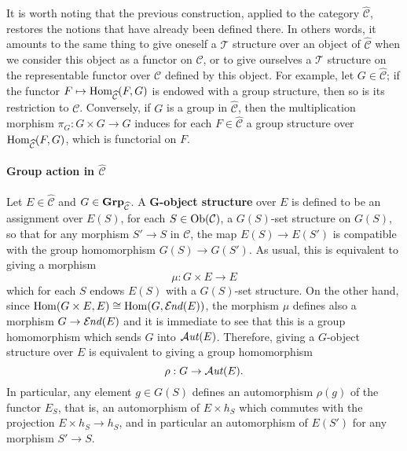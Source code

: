 \begin{remark}
It is worth noting that the previous construction, applied to the category $\widehat{\mathcal{C}}$, restores the notions that have already been defined there. In others words, it amounts to the same thing to give oneself a $\mathcal{T}$ structure over an object of $\widehat{\mathcal{C}}$ when we consider this object as a functor on $\mathcal{C}$, or to give ourselves a $\mathcal{T}$ structure on the representable functor over $\mathcal{C}$ defined by this object. For example, let $G\in\widehat{\mathcal{C}}$; if the functor $F\mapsto\mathrm{Hom}_{\widehat{\mathcal{C}}}(F,G)$ is endowed with a group structure, then so is its restriction to $\mathcal{C}$. Conversely, if $G$ is a group in $\widehat{\mathcal{C}}$, then the multiplication morphism $\pi_G:G\times G\to G$ induces for each $F\in\widehat{\mathcal{C}}$ a group structure over $\mathrm{Hom}_{\widehat{\mathcal{C}}}(F,G)$, which is functorial on $F$.
\end{remark}

\paragraph{Group action in \texorpdfstring{$\widehat{\mathcal{C}}$}{PSh}}
Let $E\in\widehat{\mathcal{C}}$ and $G\in\mathbf{Grp}_{\widehat{\mathcal{C}}}$. A \textbf{$\bm{G}$-object structure} over $E$ is defined to be an assignment over $E(S)$, for each $S\in\mathrm{Ob}(\mathcal{C})$, a $G(S)$-set structure on $G(S)$, so that for any morphism $S'\to S$ in $\mathcal{C}$, the map $E(S)\to E(S')$ is compatible with the group homomorphism $G(S)\to G(S')$. As usual, this is equivalent to giving a morphism
\[\mu:G\times E\to E\]
which for each $S$ endows $E(S)$ with a $G(S)$-set structure. On the other hand, since $\mathrm{Hom}(G\times E,E)\cong\mathrm{Hom}(G,\operatorname{\mathcal{E}\hspace*{-1pt}\textit{nd}\hspace{0.5pt}}(E))$, the morphism $\mu$ defines also a morphism $G\to\operatorname{\mathcal{E}\hspace*{-1pt}\textit{nd}\hspace{0.5pt}}(E)$ and it is immediate to see that this is a group homomorphism which sends $G$ into $\operatorname{\mathcal{A}\hspace*{-0.2pt}\textit{ut}\hspace{0.5pt}}(E)$. Therefore, giving a $G$-object structure over $E$ is equivalent to giving a group homomorphism
\[\rho:G\to\operatorname{\mathcal{A}\hspace*{-0.2pt}\textit{ut}\hspace{0.5pt}}(E).\]
In particular, any element $g\in G(S)$ defines an automorphism $\rho(g)$ of the functor $E_S$, that is, an automorphism of $E\times h_S$ which commutes with the projection $E\times h_S\to h_S$, and in particular an automorphism of $E(S')$ for any morphism $S'\to S$.

